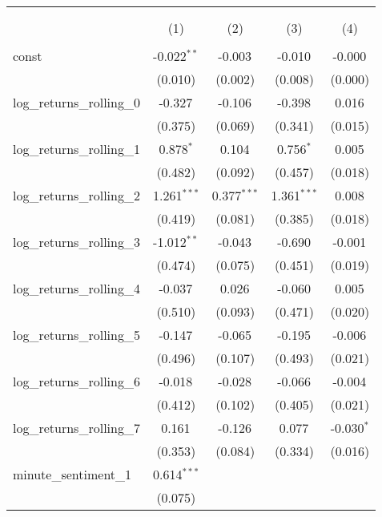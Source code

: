 \documentclass[12pt, letterpaper]{article}
\begin{document}
\begin{table}[H] 
    \begin{adjustbox}{width=\textwidth}
    \centering
    \begin{tabular}{@{\extracolsep{5pt}}lcccc}
    \\[-1.8ex]\hline
    \hline \\[-1.8ex]
    \\[-1.8ex] & (1) & (2) & (3) & (4) \\
    \hline \\[-1.8ex]
    const & -0.022$^{**}$ & -0.003$^{}$ & -0.010$^{}$ & -0.000$^{}$ \\
    & (0.010) & (0.002) & (0.008) & (0.000) \\
    log\_returns\_rolling\_0 & -0.327$^{}$ & -0.106$^{}$ & -0.398$^{}$ & 0.016$^{}$ \\
    & (0.375) & (0.069) & (0.341) & (0.015) \\
    log\_returns\_rolling\_1 & 0.878$^{*}$ & 0.104$^{}$ & 0.756$^{*}$ & 0.005$^{}$ \\
    & (0.482) & (0.092) & (0.457) & (0.018) \\
    log\_returns\_rolling\_2 & 1.261$^{***}$ & 0.377$^{***}$ & 1.361$^{***}$ & 0.008$^{}$ \\
    & (0.419) & (0.081) & (0.385) & (0.018) \\
    log\_returns\_rolling\_3 & -1.012$^{**}$ & -0.043$^{}$ & -0.690$^{}$ & -0.001$^{}$ \\
    & (0.474) & (0.075) & (0.451) & (0.019) \\
    log\_returns\_rolling\_4 & -0.037$^{}$ & 0.026$^{}$ & -0.060$^{}$ & 0.005$^{}$ \\
    & (0.510) & (0.093) & (0.471) & (0.020) \\
    log\_returns\_rolling\_5 & -0.147$^{}$ & -0.065$^{}$ & -0.195$^{}$ & -0.006$^{}$ \\
    & (0.496) & (0.107) & (0.493) & (0.021) \\
    log\_returns\_rolling\_6 & -0.018$^{}$ & -0.028$^{}$ & -0.066$^{}$ & -0.004$^{}$ \\
    & (0.412) & (0.102) & (0.405) & (0.021) \\
    log\_returns\_rolling\_7 & 0.161$^{}$ & -0.126$^{}$ & 0.077$^{}$ & -0.030$^{*}$ \\
    & (0.353) & (0.084) & (0.334) & (0.016) \\
    minute\_sentiment\_1 & 0.614$^{***}$ & & & \\
    & (0.075) & & & \\

\end{tabular}
\end{adjustbox}
\end{table}
\end{document}
